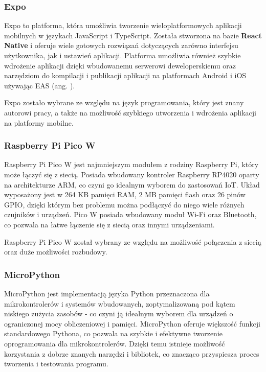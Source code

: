 \subsubsection*{Expo}

Expo to platforma, która umożliwia tworzenie wieloplatformowych aplikacji mobilnych w językach JavaScript i TypeScript. Została stworzona na bazie {\bfseries React Native} i oferuje wiele gotowych rozwiązań dotyczących zarówno interfejsu użytkownika, jak i ustawień aplikacji. Platforma umożliwia również szybkie wdrożenie aplikacji dzięki wbudowanemu serwerowi deweloperskiemu oraz narzędziom do kompilacji i publikacji aplikacji na platformach Android i iOS używając EAS (ang. ). \cite{bib:expo}

Expo zostało wybrane ze względu na język programowania, który jest znany autorowi pracy, a także na możliwość szybkiego utworzenia i wdrożenia aplikacji na platformy mobilne.

\subsubsection*{Raspberry Pi Pico W}

Raspberry Pi Pico W jest najmniejszym modułem z rodziny Raspberry Pi, który może łączyć się z siecią. Posiada wbudowany kontroler Raspberry RP4020 oparty na architekturze ARM, co czyni go idealnym wyborem do zastosowań IoT. Układ wyposażony jest w 264 KB pamięci RAM, 2 MB pamięci flash oraz 26 pinów GPIO, dzięki którym bez problemu można podłączyć do niego wiele różnych czujników i urządzeń. Pico W posiada wbudowany moduł Wi-Fi oraz Bluetooth, co pozwala na łatwe łączenie się z siecią oraz innymi urządzeniami.

Raspberry Pi Pico W został wybrany ze względu na możliwość połączenia z siecią oraz duże możliwości rozbudowy. \cite{bib:picoW}

\subsubsection*{MicroPython}

MicroPython jest implementacją języka Python przeznaczona dla mikrokontrolerów i systemów wbudowanych, zoptymalizowaną pod kątem niskiego zużycia zasobów - co czyni ją idealnym wyborem dla urządzeń o ograniczonej mocy obliczeniowej i pamięci. MicroPython oferuje większość funkcji standardowego Pythona, co pozwala na szybkie i efektywne tworzenie oprogramowania dla mikrokontrolerów. Dzięki temu istnieje możliwość korzystania z dobrze znanych narzędzi i bibliotek, co znacząco przyspiesza proces tworzenia i testowania programu. \cite{bib:micropython}

